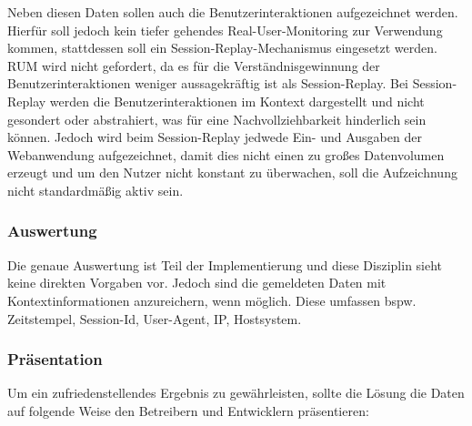 	Neben diesen Daten sollen auch die Benutzerinteraktionen aufgezeichnet werden. Hierfür soll jedoch kein tiefer gehendes Real-User-Monitoring zur Verwendung kommen, stattdessen soll ein Session-Replay-Mechanismus eingesetzt werden. RUM wird nicht gefordert, da es für die Verständnisgewinnung der Benutzerinteraktionen weniger aussagekräftig ist als Session-Replay. Bei Session-Replay werden die Benutzerinteraktionen im Kontext dargestellt und nicht gesondert oder abstrahiert, was für eine Nachvollziehbarkeit hinderlich sein können. Jedoch wird beim Session-Replay jedwede Ein- und Ausgaben der Webanwendung aufgezeichnet, damit dies nicht einen zu großes Datenvolumen erzeugt und um den Nutzer nicht konstant zu überwachen, soll die Aufzeichnung nicht standardmäßig aktiv sein.
	
	\subsubsection{Auswertung}
	
	Die genaue Auswertung ist Teil der Implementierung und diese Disziplin sieht keine direkten Vorgaben vor. Jedoch sind die gemeldeten Daten mit Kontextinformationen anzureichern, wenn möglich. Diese umfassen bspw. Zeitstempel, Session-Id, User-Agent, IP, Hostsystem.
	
	\subsubsection{Präsentation}
	
	Um ein zufriedenstellendes Ergebnis zu gewährleisten, sollte die Lösung die Daten auf folgende Weise den Betreibern und Entwicklern präsentieren:
	
